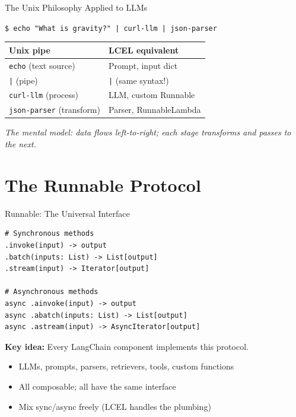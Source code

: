 \documentclass[aspectratio=169,11pt]{beamer}
\begin{document}
\begin{frame}{The Unix Philosophy Applied to LLMs}
  \begin{center}
    \texttt{\$ echo "What is gravity?" | curl-llm | json-parser}
  \end{center}

  \vspace{0.3em}
  \small
  \begin{tabular}{ll}
    \textbf{Unix pipe} & \textbf{LCEL equivalent} \\
    \hline
    \texttt{echo} (text source) & Prompt, input dict \\
    \texttt{|} (pipe) & \texttt{|} (same syntax!) \\
    \texttt{curl-llm} (process) & LLM, custom Runnable \\
    \texttt{json-parser} (transform) & Parser, RunnableLambda \\
  \end{tabular}

  \vspace{0.3em}
  \small \textit{The mental model: data flows left-to-right; each stage transforms and passes to the next.}
\end{frame}

\section{The Runnable Protocol}

\begin{frame}{Runnable: The Universal Interface}
  \begin{codebox}
\begin{lstlisting}
# Synchronous methods
.invoke(input) -> output
.batch(inputs: List) -> List[output]
.stream(input) -> Iterator[output]

# Asynchronous methods
async .ainvoke(input) -> output
async .abatch(inputs: List) -> List[output]
async .astream(input) -> AsyncIterator[output]
\end{lstlisting}
  \end{codebox}

  \vspace{0.12em}
  \textbf{Key idea:} Every LangChain component implements this protocol.

  \begin{itemize}\setlength{\itemsep}{1pt}
    \item LLMs, prompts, parsers, retrievers, tools, custom functions
    \item All composable; all have the same interface
    \item Mix sync/async freely (LCEL handles the plumbing)
  \end{itemize}
\end{frame}
\end{document}

